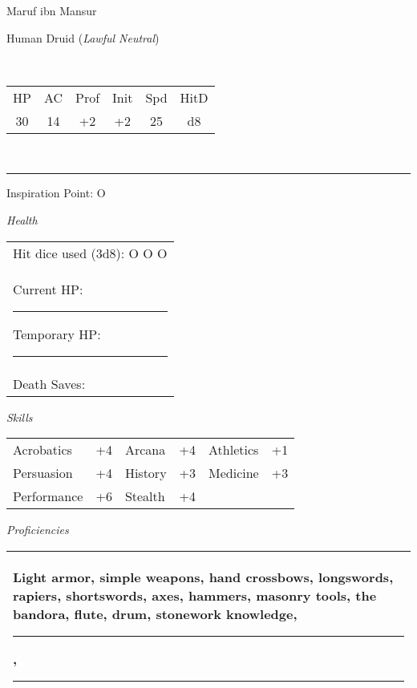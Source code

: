 \documentclass[letterpaper,10pt,twoside,twocolumn,openany]{book}
\begin{document}
{\LARGE{Maruf ibn Mansur}}

Human Druid (\textit{Lawful Neutral})

\stats[
    STR=\stat{9},
    DEX=\stat{16},
    CON=\stat{10},
    INT=\stat{10},
    WIS=\stat{16},
    CHA=\stat{15},
]

\begingroup
  \small\centering\color{titlered}
  \\[0.4em]
\endgroup

\begin{tabular}{cccccc}
  HP & AC & Prof & Init & Spd & HitD \\
  30 & 14 & +2   & +2   & 25  & d8   \\
\end{tabular}\\[2pt]
\rule{1.95in}{0pt}Inspiration Point: {\Large O}

{\Large{\textit{Health}}}\\
\begin{tabular}{|m{3.1in}|}
Hit dice used (3d8): O O O\\[5pt]
Current HP: \rule{.4in}{.2pt} Temporary HP: \rule{.4in}{.2pt}\\[5pt]
Death Saves: $ $ $ $ $ $ \ \ \  \\[5pt]
\end{tabular}
\vspace{12pt}

{\Large{\textit{Skills}} }\\
\begin{tabular}{|llllll|}
\hline
Acrobatics &+4&Arcana& +4&Athletics& +1\\
Persuasion &+4&History& +3&Medicine& +3\\
Performance &+6&Stealth& +4&&\\
\hline
\end{tabular}
\vspace{12pt}

{\Large{\textit{Proficiencies}}}\\
\begin{tabular}{|m{3.1in}|}
\hline
Light armor, simple weapons, hand crossbows, longswords, rapiers, shortswords, axes, hammers, masonry tools,
the bandora, flute, drum, stonework knowledge, \rule{1in}{.2pt}, \rule{1in}{.2pt}\\
\hline
\end{tabular}
\vspace{12pt}
\end{document}
